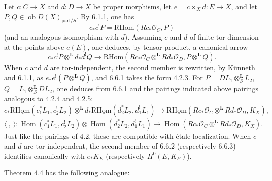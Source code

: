 \documentclass[11pt]{article}
\providecommand{\cO}{\mathcal{O}}
\DeclareMathOperator{\Hom}{Hom}
\providecommand{\Hom}{\operatorname{Hom}}
\providecommand{\Hom}{\operatorname{Hom}}
\begin{document}
Let $c:C\to X$ and $d:D\to X$ be proper morphisms, let $e=c\times_Xd:E\to X$, and let $P,Q\in\operatorname{ob}D(X)_{\mathrm{parf}/S}$. By 6.1.1, one has
\[
c_*c^!P=\mathrm{R}\underline{\mathrm{Hom}}(Rc_*\cO_C,P)
\]
(and an analogous isomorphism with $d$). Assuming $c$ and $d$ of finite tor-dimension at the points above $e(E)$, one deduces, by tensor product, a canonical arrow
\begin{equation}
\tag{6.6.1}
c_*c^!P\otimes^{\mathbf L}d_*d^!Q\longrightarrow
\mathrm{R}\underline{\mathrm{Hom}}(Rc_*\cO_C\otimes^{\mathbf L}Rd_*\cO_D,P\otimes^{\mathbf L}Q).
\end{equation}
When $c$ and $d$ are tor-independent, the second member is rewritten, by Künneth and 6.1.1, as $e_*e^!(P\otimes^{\mathbf L}Q)$, and 6.6.1 takes the form 4.2.3. For $P=DL_1\otimes_S^{\mathbf L}L_2$, $Q=L_1\otimes_S^{\mathbf L}DL_2$, one deduces from 6.6.1 and the pairings indicated above pairings analogous to 4.2.4 and 4.2.5:
\begin{equation}
\tag{6.6.2}
c_*\mathrm{R}\underline{\mathrm{Hom}}(c_1^*L_1,c_2^!L_2)\otimes^{\mathbf L}d_*\mathrm{R}\underline{\mathrm{Hom}}(d_2^*L_2,d_1^!L_1)
\longrightarrow\mathrm{R}\underline{\mathrm{Hom}}(Rc_*\cO_C\otimes^{\mathbf L}Rd_*\cO_D,K_X),
\end{equation}
\begin{equation}
\tag{6.6.3}
\langle\ ,\ \rangle:\Hom(c_1^*L_1,c_2^!L_2)\otimes\Hom(d_2^*L_2,d_1^!L_1)
\longrightarrow\Hom(Rc_*\cO_C\otimes^{\mathbf L}Rd_*\cO_D,K_X).
\end{equation}
Just like the pairings of 4.2, these are compatible with étale localization. When $c$ and $d$ are tor-independent, the second member of 6.6.2 (respectively 6.6.3) identifies canonically with $e_*K_E$ (respectively $H^0(E,K_E)$).

Theorem 4.4 has the following analogue:
\end{document}

